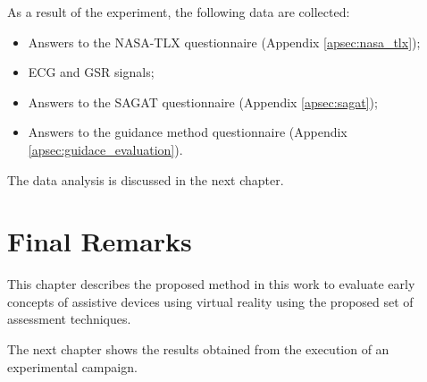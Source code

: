 As a result of the experiment, the following data are collected:

\begin{itemize}
    \item Answers to the NASA-TLX questionnaire (Appendix \ref{apsec:nasa_tlx});
    \item ECG and GSR signals;
    \item Answers to the SAGAT questionnaire (Appendix \ref{apsec:sagat});
    \item Answers to the guidance method questionnaire (Appendix \ref{apsec:guidace_evaluation}).
\end{itemize}

The data analysis is discussed in the next chapter.

\section{Final Remarks}

This chapter describes the proposed method in this work to evaluate early concepts of assistive devices using virtual reality using the proposed set of assessment techniques. 

The next chapter shows the results obtained from the execution of an experimental campaign.